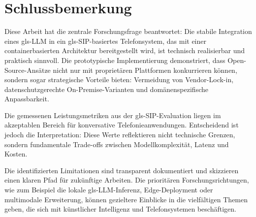 \section{Schlussbemerkung}

Diese Arbeit hat die zentrale Forschungsfrage beantwortet: Die stabile Integration eines \gls{gls-LLM} in ein \gls{gls-SIP}-basiertes Telefonsystem, das mit einer containerbasierten Architektur bereitgestellt wird, ist technisch realisierbar und praktisch sinnvoll. Die prototypische Implementierung demonstriert, dass Open-Source-Ansätze nicht nur mit proprietären Plattformen konkurrieren können, sondern sogar strategische Vorteile bieten: Vermeidung von Vendor-Lock-in, datenschutzgerechte On-Premise-Varianten und domänenspezifische Anpassbarkeit.

Die gemessenen Leistungsmetriken aus der \gls{gls-SIP}-Evaluation liegen im akzeptablen Bereich für konversative Telefonieanwendungen. Entscheidend ist jedoch die Interpretation: Diese Werte reflektieren nicht technische Grenzen, sondern fundamentale Trade-offs zwischen Modellkomplexität, Latenz und Kosten.

Die identifizierten Limitationen sind transparent dokumentiert und skizzieren einen klaren Pfad für zukünftige Arbeiten. Die prioritären Forschungsrichtungen, wie zum Beispiel die lokale \gls{gls-LLM}-Inferenz, Edge-Deployment oder multimodale Erweiterung, können gezieltere Einblicke in die vielfältigen Themen geben, die sich mit künstlicher Intelligenz und Telefonsystemen beschäftigen.